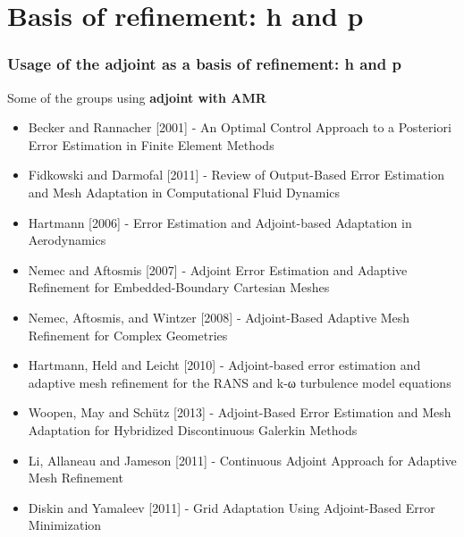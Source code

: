 \documentclass{beamer}
\begin{document}
\section[Usage]{Basis of refinement: h and p}
\begin{frame}%
\frametitle{\scriptsize{Usage of the adjoint as a basis of refinement: h and p}}
\scriptsize
Some of the groups using \textbf{adjoint with AMR}
\begin{itemize}
\item Becker and Rannacher [2001] - An Optimal Control Approach to a Posteriori Error Estimation in Finite Element Methods
\item Fidkowski and Darmofal [2011] - Review of Output-Based Error Estimation and Mesh Adaptation in Computational Fluid Dynamics
\item Hartmann [2006] - Error Estimation and Adjoint-based Adaptation in Aerodynamics
\item Nemec and Aftosmis [2007] - Adjoint Error Estimation and Adaptive Refinement for Embedded-Boundary Cartesian Meshes
\item Nemec, Aftosmis, and Wintzer [2008] - Adjoint-Based Adaptive Mesh Refinement for Complex Geometries
\item Hartmann, Held and Leicht [2010] - Adjoint-based error estimation and adaptive mesh refinement for the RANS and k-ω turbulence model equations
\item Woopen, May and Sch{\"u}tz [2013] - Adjoint-Based Error Estimation and Mesh Adaptation for Hybridized Discontinuous Galerkin Methods
\item Li, Allaneau and Jameson [2011] - Continuous Adjoint Approach for Adaptive Mesh Refinement
\item Diskin and Yamaleev [2011] - Grid Adaptation Using Adjoint-Based Error Minimization
\end{itemize}
\end{frame}

\end{document}
